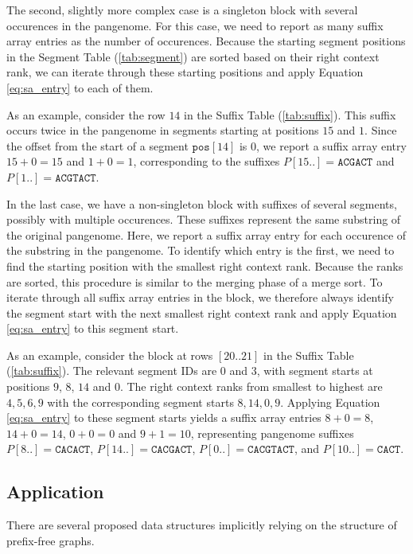 The second, slightly more complex case is a singleton block with several occurences in the pangenome.
For this case, we need to report as many suffix array entries as the number of occurences.
Because the starting segment positions in the Segment Table (\ref{tab:segment}) are sorted based on their right context rank, we can iterate through these starting positions and apply Equation \ref{eq:sa_entry} to each of them.

As an example, consider the row $14$ in the Suffix Table (\ref{tab:suffix}).
This suffix occurs twice in the pangenome in segments starting at positions $15$ and $1$.
Since the offset from the start of a segment $\texttt{pos}[14]$ is $0$, we report a suffix array entry $15 + 0 = 15$ and $1 + 0 = 1$, corresponding to the suffixes $P[15..] = \texttt{ACGACT}$ and $P[1..] = \texttt{ACGTACT}$.

In the last case, we have a non-singleton block with suffixes of several segments, possibly with multiple occurences.
These suffixes represent the same substring of the original pangenome.
Here, we report a suffix array entry for each occurence of the substring in the pangenome.
To identify which entry is the first, we need to find the starting position with the smallest right context rank.
Because the ranks are sorted, this procedure is similar to the merging phase of a merge sort.
To iterate through all suffix array entries in the block, we therefore always identify the segment start with the next smallest right context rank and apply Equation \ref{eq:sa_entry} to this segment start.

As an example, consider the block at rows $[20..21]$ in the Suffix Table (\ref{tab:suffix}).
The relevant segment IDs are $0$ and $3$, with segment starts at positions $9$, $8$, $14$ and $0$.
The right context ranks from smallest to highest are $4, 5, 6, 9$ with the corresponding segment starts $8, 14, 0, 9$.
Applying Equation \ref{eq:sa_entry} to these segment starts yields a suffix array entries $8 + 0 = 8$, $14 + 0 = 14$, $0 + 0 = 0$ and $9 + 1 = 10$, representing pangenome suffixes $P[8..] = \texttt{CACACT}$, $P[14..] = \texttt{CACGACT}$, $P[0..] = \texttt{CACGTACT}$, and $P[10..] = \texttt{CACT}$.

\subsection{Application}
There are several proposed data structures implicitly relying on the structure
of prefix-free graphs.

